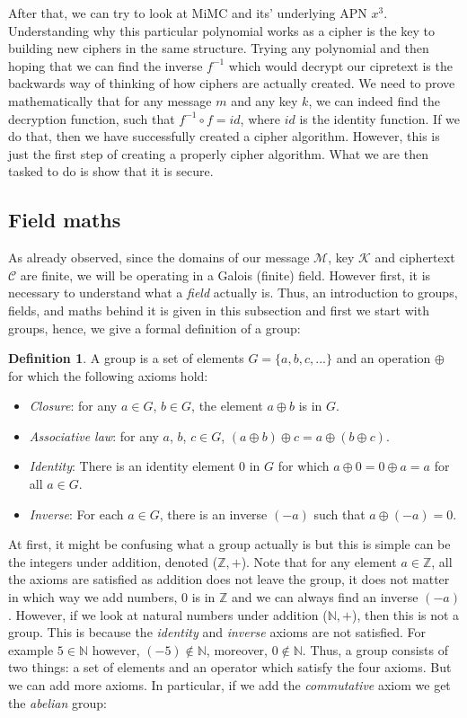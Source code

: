 \documentclass{Resources/UoBLab1}
\theoremstyle{definition}
\newtheorem{definition}[theorem]{Definition}
\begin{document}
After that, we can try to look at MiMC and its' underlying APN $x^3$. Understanding why this particular polynomial works as a cipher is the key to building new ciphers in the same structure. Trying any polynomial and then hoping that we can find the inverse $f^{-1}$ which would decrypt our cipretext is the backwards way of thinking of how ciphers are actually created. We need to prove mathematically that for any message $m$ and any key $k$, we can indeed find the decryption function, such that \(f^{-1} \circ f = id\), where $id$ is the identity function. If we do that, then we have successfully created a cipher algorithm. However, this is just the first step of creating a properly cipher algorithm. What we are then tasked to do is show that it is secure.

\subsection{Field maths}
As already observed, since the domains of our message $\mathcal{M}$, key $\mathcal{K}$ and ciphertext $\mathcal{C}$ are finite, we will be operating in a Galois (finite) field. However first, it is necessary to understand what a \textit{field} actually is. Thus, an introduction to groups, fields, and maths behind it is given in this subsection and first we start with groups, hence, we give a formal definition of a group:
\begin{definition}
    A group is a set of elements $G = \{a, b, c, ...\}$ and an operation $\oplus$ for which the following axioms hold:
    \begin{itemize}
        \item \textit{Closure}: for any $a \in G$, $b \in G$, the element $a \oplus b$ is in $G$.
        \item \textit{Associative law}: for any $a$, $b$, $c \in G$, $(a \oplus b) \oplus c = a \oplus (b \oplus c)$.
        \item \textit{Identity}: There is an identity element $0$ in $G$ for which $a \oplus 0 = 0 \oplus a = a$ for all $a \in G$.
        \item \textit{Inverse}: For each $a \in G$, there is an inverse $(-a)$ such that $a \oplus (-a) = 0$.
    \end{itemize}
\end{definition}
At first, it might be confusing what a group actually is but this is simple can be the integers under addition, denoted ($\mathbb{Z}, +$). Note that for any element $a \in \mathbb{Z}$, all the axioms are satisfied as addition does not leave the group, it does not matter in which way we add numbers, $0$ is in $\mathbb{Z}$ and we can always find an inverse $(-a)$. However, if we look at natural numbers under addition ($\mathbb{N}, +$), then this is not a group. This is because the \textit{identity} and \textit{inverse} axioms are not satisfied. For example $5 \in \mathbb{N}$ however, $(-5) \notin \mathbb{N}$, moreover, $0 \notin \mathbb{N}$. Thus, a group consists of two things: a set of elements and an operator which satisfy the four axioms. But we can add more axioms. In particular, if we add the \textit{commutative} axiom we get the \textit{abelian} group:
\end{document}

